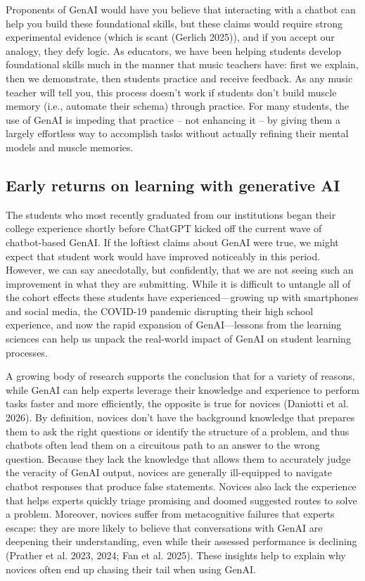 \documentclass[
]{hdsr}
\begin{document}
Proponents of GenAI would have you believe that interacting with a
chatbot can help you build these foundational skills, but these claims
would require strong experimental evidence (which is scant (Gerlich
2025)), and if you accept our analogy, they defy logic. As educators, we
have been helping students develop foundational skills much in the
manner that music teachers have: first we explain, then we demonstrate,
then students practice and receive feedback. As any music teacher will
tell you, this process doesn't work if students don't build muscle
memory (i.e., automate their schema) through practice. For many
students, the use of GenAI is impeding that practice -- not enhancing it
-- by giving them a largely effortless way to accomplish tasks without
actually refining their mental models and muscle memories.

\subsection{Early returns on learning with generative
AI}\label{early-returns-on-learning-with-generative-ai}

The students who most recently graduated from our institutions began
their college experience shortly before ChatGPT kicked off the current
wave of chatbot-based GenAI. If the loftiest claims about GenAI were
true, we might expect that student work would have improved noticeably
in this period. However, we can say anecdotally, but confidently, that
we are not seeing such an improvement in what they are submitting. While
it is difficult to untangle all of the cohort effects these students
have experienced---growing up with smartphones and social media, the
COVID-19 pandemic disrupting their high school experience, and now the
rapid expansion of GenAI---lessons from the learning sciences can help
us unpack the real-world impact of GenAI on student learning processes.

A growing body of research supports the conclusion that for a variety of
reasons, while GenAI can help experts leverage their knowledge and
experience to perform tasks faster and more efficiently, the opposite is
true for novices (Daniotti et al. 2026). By definition, novices don't
have the background knowledge that prepares them to ask the right
questions or identify the structure of a problem, and thus chatbots
often lead them on a circuitous path to an answer to the wrong question.
Because they lack the knowledge that allows them to accurately judge the
veracity of GenAI output, novices are generally ill-equipped to navigate
chatbot responses that produce false statements. Novices also lack the
experience that helps experts quickly triage promising and doomed
suggested routes to solve a problem. Moreover, novices suffer from
metacognitive failures that experts escape: they are more likely to
believe that conversations with GenAI are deepening their understanding,
even while their assessed performance is declining (Prather et al. 2023,
2024; Fan et al. 2025). These insights help to explain why novices often
end up chasing their tail when using GenAI.
\end{document}
